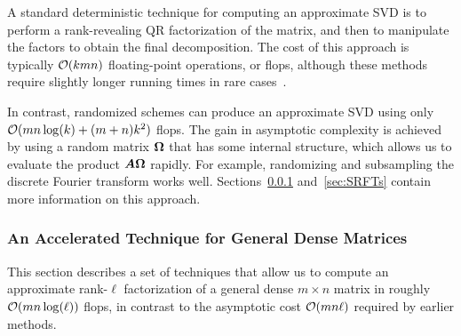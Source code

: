 \documentclass[12pt]{article}
\begin{document}
A standard deterministic technique for computing an approximate SVD is to perform a rank-revealing QR factorization of the matrix, and then to manipulate the factors to obtain the final decomposition.
The cost of this approach is typically $\mathcal{O}(kmn)$ floating-point
operations, or flops, although these methods require slightly
longer running times in rare cases~\cite{gu_rrqr}.

In contrast, randomized schemes can produce an approximate SVD using
only $\mathcal{O}(mn\log(k) + (m+n)k^2)$ flops.  The gain in asymptotic
complexity is achieved by using a random matrix $\bm{\Omega}$ that
has some internal structure, which allows us to evaluate the
product $\bm{A\Omega}$ rapidly.  For example,
randomizing and subsampling the discrete Fourier transform
works well.  Sections~\ref{sec:ailonchazelle} and~\ref{sec:SRFTs}
contain more information on this approach.

\subsubsection{An Accelerated Technique for General Dense Matrices}
\label{sec:ailonchazelle}

This section describes a set of techniques that allow us to compute
an approximate rank-$\ell$ factorization of a general dense $m \times n$
matrix in roughly $\mathcal{O}(mn\log(\ell))$ flops, in contrast to the
asymptotic cost $\mathcal{O}(mn\ell)$ required by earlier methods.



\end{document}
